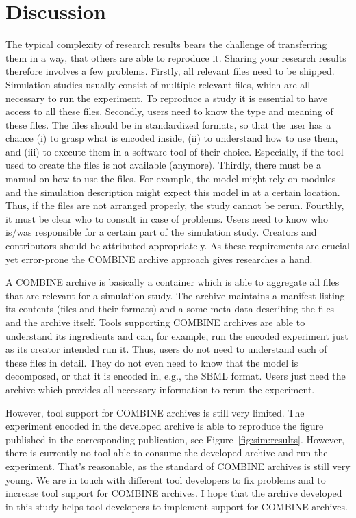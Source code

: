 

\section{Discussion}
The typical complexity of research results bears the challenge of transferring them in a way, that others are able to reproduce it.
Sharing your research results therefore involves a few problems.
Firstly, all relevant files need to be shipped.
Simulation studies usually consist of multiple relevant files, which are all necessary to run the experiment.
To reproduce a study it is essential to have access to all these files.
Secondly, users need to know the type and meaning of these files.
The files should be in standardized formats, so that the user has a chance (i) to grasp what is encoded inside, (ii) to understand how to use them, and (iii) to execute them in a software tool of their choice.
Especially, if the tool used to create the files is not available (anymore).
Thirdly, there must be a manual on how to use the files.
For example, the model might rely on modules and the simulation description might expect this model in at a certain location.
Thus, if the files are not arranged properly, the study cannot be rerun.
Fourthly, it must be clear who to consult in case of problems.
Users need to know who is/was responsible for a certain part of the simulation study.
Creators and contributors should be attributed appropriately.
As these requirements are crucial yet error-prone the COMBINE archive approach gives researches a hand.

A COMBINE archive is basically a container which is able to aggregate all files that are relevant for a simulation study.
The archive maintains a manifest listing its contents (files and their formats) and a some meta data describing the files and the archive itself.
Tools supporting COMBINE archives are able to understand its ingredients and can, for example, run the encoded experiment just as its creator intended run it.
Thus, users do not need to understand each of these files in detail.
They do not even need to know that the model is decomposed, or that it is encoded in, e.g., the SBML format.
Users just need the archive which provides all necessary information to rerun the experiment.

However, tool support for COMBINE archives is still very limited.
The experiment encoded in the developed archive is able to reproduce the figure published in the corresponding publication, see Figure~\ref{fig:sim:results}.
However, there is currently no tool able to consume the developed archive and run the experiment.
That's reasonable, as the standard of COMBINE archives is still very young.
We are in touch with different tool developers to fix problems and to increase tool support for COMBINE archives.
I hope that the archive developed in this study helps tool developers to implement support for COMBINE archives.


